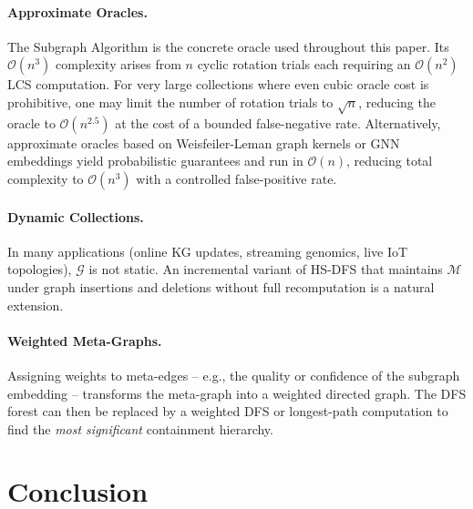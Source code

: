 ﻿\documentclass[12pt,a4paper]{article}
\theoremstyle{plain}
\theoremstyle{definition}
\theoremstyle{remark}
\begin{document}
	\paragraph{Approximate Oracles.}
	The Subgraph Algorithm \cite{epp2026subgraph} is the concrete oracle
	used throughout this paper.  Its $\mathcal{O}(n^3)$ complexity arises
	from $n$ cyclic rotation trials each requiring an $\mathcal{O}(n^2)$
	LCS computation.  For very large collections where even cubic oracle
	cost is prohibitive, one may limit the number of rotation trials to
	$\sqrt{n}$, reducing the oracle to $\mathcal{O}(n^{2.5})$ at the cost
	of a bounded false-negative rate.  Alternatively, approximate oracles
	based on Weisfeiler-Leman graph kernels or GNN embeddings yield
	probabilistic guarantees and run in $\mathcal{O}(n)$, reducing total
	complexity to $\mathcal{O}(n^3)$ with a controlled false-positive rate.
	
	\paragraph{Dynamic Collections.}
	In many applications (online KG updates, streaming genomics, live IoT
	topologies), $\mathcal{G}$ is not static.  An incremental variant of HS-DFS
	that maintains $\mathcal{M}$ under graph insertions and deletions without
	full recomputation is a natural extension.
	
	\paragraph{Weighted Meta-Graphs.}
	Assigning weights to meta-edges -- e.g., the quality or confidence of the
	subgraph embedding -- transforms the meta-graph into a weighted directed
	graph.  The DFS forest can then be replaced by a weighted DFS or
	longest-path computation to find the \emph{most significant} containment
	hierarchy.
	
	\section{Conclusion}
	\label{sec:conclusion}
	
\end{document}
